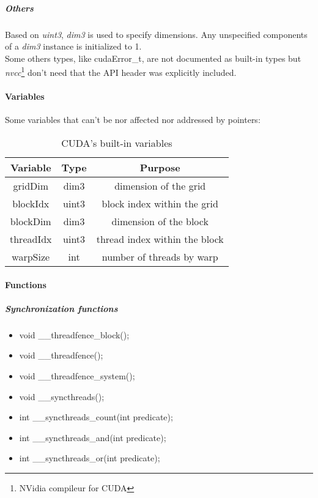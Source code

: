 					\subparagraph{Others}

Based on \emph{uint3}, \emph{dim3} is used to specify dimensions. Any unspecified components of a \emph{dim3} instance is initialized to 1.\\

Some others types, like cudaError\_t, are not documented as built-in types but \emph{nvcc}\footnote{NVidia compileur for CUDA} don't need that the 
API header was explicitly included.

				\paragraph{Variables}

Some variables that can't be nor affected nor addressed by pointers:
\begin{table}[!h]
	\caption{CUDA's built-in variables}
	\center
	\begin{tabular}{|c|c|c|} \hline
	Variable & Type & Purpose \\\hline\hline
	gridDim   & dim3  & dimension of the grid \\\hline
	blockIdx  & uint3 & block index within the grid \\\hline
	blockDim  & dim3  & dimension of the block \\\hline
	threadIdx & uint3 & thread index within the block \\\hline
	warpSize  & int   & number of threads by warp \\\hline
	\end{tabular}
	\label{heterogeneous:tabCudaVariable}
\end{table}

				\paragraph{Functions}

					\subparagraph{Synchronization functions}
					
\begin{itemize}
	\item void \_\_threadfence\_block();
	\item void \_\_threadfence();
	\item void \_\_threadfence\_system();
	\item void \_\_syncthreads();
	\item int \_\_syncthreads\_count(int predicate);
	\item int \_\_syncthreads\_and(int predicate);
	\item int \_\_syncthreads\_or(int predicate);
\end{itemize}

